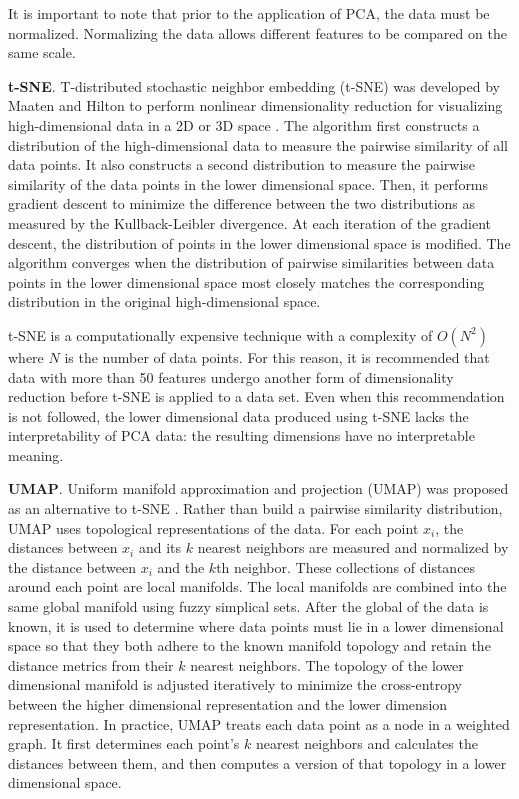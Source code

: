 It is important to note that prior to the application of PCA, the data must be normalized. Normalizing the data allows different features to be compared on the same scale.

\textbf{t-SNE}. T-distributed stochastic neighbor embedding (t-SNE) was developed by Maaten and Hilton to perform nonlinear dimensionality reduction for visualizing high-dimensional data in a 2D or 3D space \cite{Maaten2008}. The algorithm first constructs a distribution of the high-dimensional data to measure the pairwise similarity of all data points. It also constructs a second distribution to measure the pairwise similarity of the data points in the lower dimensional space. Then, it performs gradient descent to minimize the difference between the two distributions as measured by the Kullback-Leibler divergence. At each iteration of the gradient descent, the distribution of points in the lower dimensional space is modified. The algorithm converges when the distribution of pairwise similarities between data points in the lower dimensional space most closely matches the corresponding distribution in the original high-dimensional space.

t-SNE is a computationally expensive technique with a complexity of $O(N^2)$ where $N$ is the number of data points. For this reason, it is recommended that data with more than 50 features undergo another form of dimensionality reduction before t-SNE is applied to a data set. Even when this recommendation is not followed, the lower dimensional data produced using t-SNE lacks the interpretability of PCA data: the resulting dimensions have no interpretable meaning.

\textbf{UMAP}. Uniform manifold approximation and projection (UMAP) was proposed as an alternative to t-SNE \cite{McInnes2018}. Rather than build a pairwise similarity distribution, UMAP uses topological representations of the data. For each point $x_i$, the distances between $x_i$ and its $k$ nearest neighbors are measured and normalized by the distance between $x_i$ and the $k$th neighbor. These collections of distances around each point are local manifolds. The local manifolds are combined into the same global manifold using fuzzy simplical sets. After the global of the data is known, it is used to determine where data points must lie in a lower dimensional space so that they both adhere to the known manifold topology and retain the distance metrics from their $k$ nearest neighbors. The topology of the lower dimensional manifold is adjusted iteratively to minimize the cross-entropy between the higher dimensional representation and the lower dimension representation. In practice, UMAP treats each data point as a node in a weighted graph. It first determines each point's $k$ nearest neighbors and calculates the distances between them, and then computes a version of that topology in a lower dimensional space.

